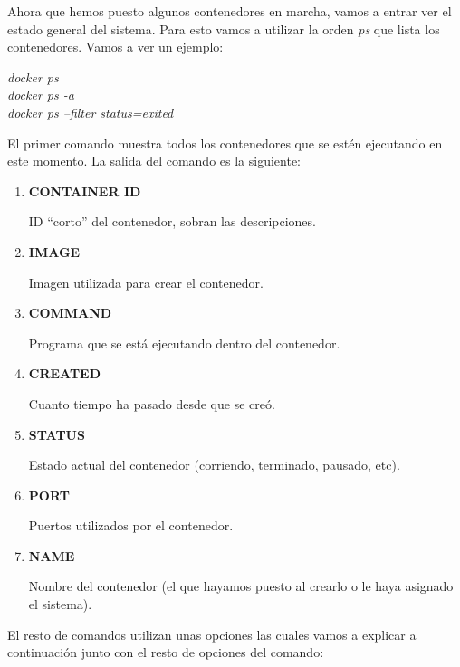 \documentclass[]{article}
\begin{document}
Ahora que hemos puesto algunos contenedores en marcha, vamos a entrar ver el estado general del sistema. Para esto vamos a utilizar la orden
{\it ps} que lista los contenedores. Vamos a ver un ejemplo:

\begin{center}
\it
	docker ps
	\\
	\vspace{1mm}
	docker ps -a
	\\
	\vspace{1mm}
	docker ps --filter status=exited
\end{center}
El primer comando muestra todos los contenedores que se estén ejecutando en este momento.
La salida del comando es la siguiente:
\begin{enumerate}
	\item {\bf CONTAINER ID}
	
		ID ``corto'' del contenedor, sobran las descripciones.
		
	\item {\bf IMAGE}
	
		Imagen utilizada para crear el contenedor.
	\item {\bf COMMAND}
	
		Programa que se está ejecutando dentro del contenedor.
	\item {\bf CREATED}
	
		Cuanto tiempo ha pasado desde que se creó.
	\item {\bf STATUS}
	
		Estado actual del contenedor (corriendo, terminado, pausado, etc).
	\item {\bf PORT}
	
		Puertos utilizados por el contenedor.
	\item {\bf NAME}
	
		Nombre del contenedor (el que hayamos puesto al crearlo o le haya asignado el sistema).

\end{enumerate}

El resto de comandos utilizan unas opciones las cuales vamos a explicar a continuación junto con el resto de opciones del comando:
\end{document}
